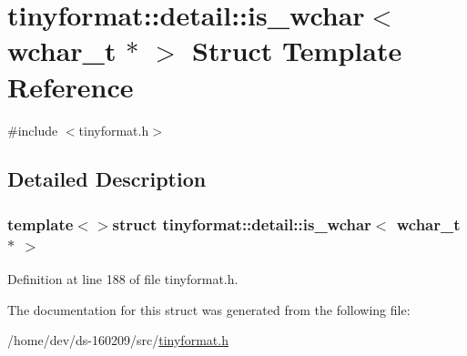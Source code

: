 \hypertarget{structtinyformat_1_1detail_1_1is__wchar_3_01wchar__t_01_5_01_4}{}\section{tinyformat\+:\+:detail\+:\+:is\+\_\+wchar$<$ wchar\+\_\+t $\ast$ $>$ Struct Template Reference}
\label{structtinyformat_1_1detail_1_1is__wchar_3_01wchar__t_01_5_01_4}


{\ttfamily \#include $<$tinyformat.\+h$>$}



\subsection{Detailed Description}
\subsubsection*{template$<$$>$struct tinyformat\+::detail\+::is\+\_\+wchar$<$ wchar\+\_\+t $\ast$ $>$}



Definition at line 188 of file tinyformat.\+h.



The documentation for this struct was generated from the following file\+:\begin{DoxyCompactItemize}
\item 
/home/dev/ds-\/160209/src/\hyperlink{tinyformat_8h}{tinyformat.\+h}\end{DoxyCompactItemize}
